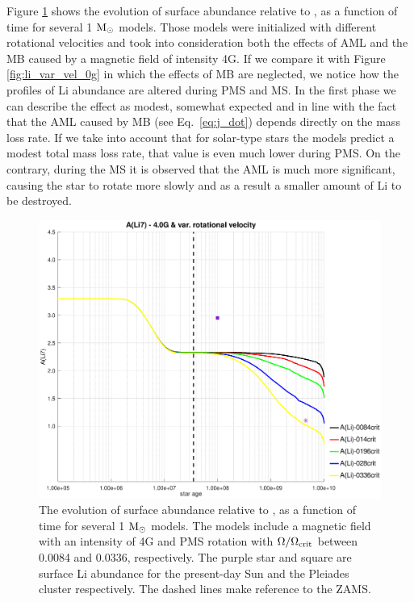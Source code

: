 \documentclass[fleqn,usenatbib]{mnras}
\begin{document}
Figure \ref{fig:li_var_vel_4_0g} shows the evolution of surface  abundance relative to , as a function of time for several 1 $\mathrm{M}_\odot$ models. Those models were initialized with different rotational velocities and took into consideration both the effects of AML and the MB caused by a magnetic field of intensity 4G. If we compare it with Figure \ref{fig:li_var_vel_0g} in which the effects of MB are neglected, we notice how the profiles of Li abundance are altered during PMS and MS. In the first phase we can describe the effect as modest, somewhat expected and in line with the fact that the AML caused by MB (see Eq.~\ref{eq:j_dot}) depends directly on the mass loss rate. If we take into account that for solar-type stars the models predict a modest total mass loss rate, that value is even much lower during PMS. On the contrary, during the MS it is observed that the AML is much more significant, causing the star to rotate more slowly and as a result a smaller amount of Li to be destroyed.\par

\begin{figure}
	\includegraphics[trim = 35mm 15mm 20mm 15mm, clip,width=\columnwidth]{figures/li_var_vel_4_0g.eps}
    \caption{The evolution of surface  abundance relative to , as a function of time for several 1 $\mathrm{M}_\odot$ models. The models include a magnetic field with an intensity of 4G and PMS rotation with $\Omega / \Omega_{\mathrm{crit}}$ between 0.0084 and 0.0336, respectively. The purple star and square are surface Li abundance for the present-day Sun \citep{Asplund2009} and the Pleiades cluster \citep{Sestito2005} respectively. The dashed lines make reference to the ZAMS.}
    \label{fig:li_var_vel_4_0g}
\end{figure}
\end{document}
